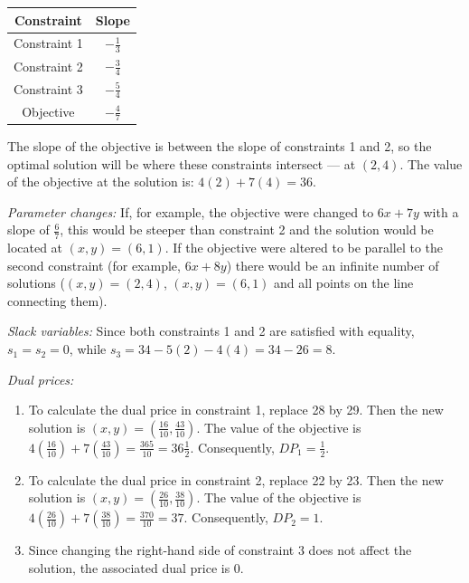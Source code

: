 \begin{original}
\begin{center}
\begin{tabular}{cc}
Constraint & Slope \\
\hline
Constraint 1 & $-\frac{1}{3}$ \\
Constraint 2 & $-\frac{3}{4}$ \\
Constraint 3 & $-\frac{5}{4}$ \\
Objective & $-\frac{4}{7}$
\end{tabular}
\end{center}

The slope of the objective is between the slope of constraints 1 and 2, so the optimal solution will be where these constraints intersect --- at $(2,4)$. The value of the objective at the solution is: $4(2) + 7(4) = 36$.

\noindent\textit{Parameter changes:} If, for example, the objective were changed to $6x + 7y$ with a slope of $\frac{6}{7}$, this would be steeper than constraint 2 and the solution would be located at $(x, y) = (6,1)$. If the objective were altered to be parallel to the second constraint (for example, $6x + 8y$) there would be an infinite number of solutions ($(x, y) = (2,4)$, $(x, y) = (6,1)$ and all points on the line connecting them).

\noindent\textit{Slack variables:} Since both constraints 1 and 2 are satisfied with equality, $s_1 = s_2 = 0$, while $s_3 = 34 - 5(2) - 4(4) = 34 - 26 = 8$.

\noindent\textit{Dual prices:}
\begin{enumerate}
\item To calculate the dual price in constraint 1, replace 28 by 29. Then the new solution is $(x, y) = \left(\frac{16}{10}, \frac{43}{10}\right)$. The value of the objective is $4\left(\frac{16}{10}\right) + 7\left(\frac{43}{10}\right) = \frac{365}{10} = 36\frac{1}{2}$. Consequently, $DP_1 = \frac{1}{2}$.
\item To calculate the dual price in constraint 2, replace 22 by 23. Then the new solution is $(x, y) = \left(\frac{26}{10}, \frac{38}{10}\right)$. The value of the objective is $4\left(\frac{26}{10}\right) + 7\left(\frac{38}{10}\right) = \frac{370}{10} = 37$. Consequently, $DP_2 = 1$.
\item Since changing the right-hand side of constraint 3 does not affect the solution, the associated dual price is 0.
\end{enumerate}
\end{original}
